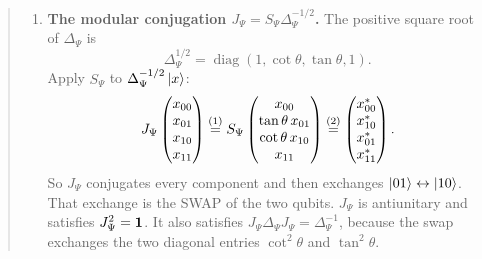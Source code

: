 \begin{quote}
\begin{enumerate}
\item \textbf{The modular conjugation $J_\Psi = S_\Psi \Delta_\Psi^{-1/2}$.} The positive square root of
$\Delta_\Psi$ is
\[
\Delta_\Psi^{1/2} = \operatorname{diag}(1, \cot\theta, \tan\theta, 1) .
\]
Apply $S_\Psi$ to $\Delta_\Psi^{-1/2}\ket x$:
\begin{align}
J_\Psi \begin{pmatrix} x_{00} \\ x_{01} \\ x_{10} \\ x_{11} \end{pmatrix}
\overset{(1)}{=} S_\Psi \begin{pmatrix} x_{00} \\ \tan\theta\, x_{01} \\ \cot\theta\, x_{10} \\ x_{11}
\end{pmatrix}
\overset{(2)}{=} \begin{pmatrix} x_{00}^* \\ x_{10}^* \\ x_{01}^* \\ x_{11}^* \end{pmatrix} . \notag
\end{align}
\quad
{}
So $J_\Psi$ conjugates every component and then exchanges $\ket{01} \leftrightarrow \ket{10}$. That exchange
is the SWAP of the two qubits. $J_\Psi$ is antiunitary and satisfies $J_\Psi^2 = \mathbf{1}$. It also satisfies
$J_\Psi \Delta_\Psi J_\Psi = \Delta_\Psi^{-1}$, because the swap exchanges the two diagonal entries
$\cot^2\theta$ and $\tan^2\theta$.


\end{enumerate}
\end{quote}
